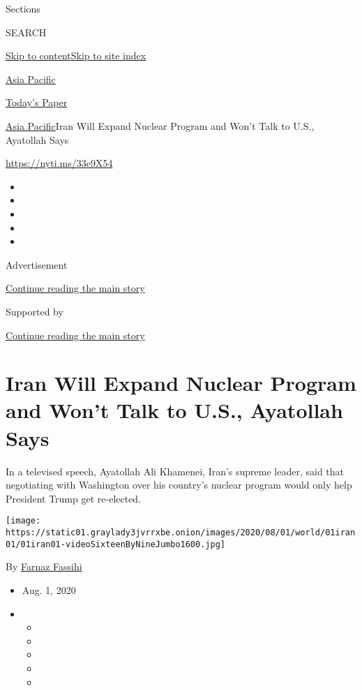 Sections

SEARCH

\protect\hyperlink{site-content}{Skip to
content}\protect\hyperlink{site-index}{Skip to site index}

\href{https://www.nytimes3xbfgragh.onion/section/world/asia}{Asia
Pacific}

\href{https://myaccount.nytimes3xbfgragh.onion/auth/login?response_type=cookie\&client_id=vi}{}

\href{https://www.nytimes3xbfgragh.onion/section/todayspaper}{Today's
Paper}

\href{/section/world/asia}{Asia Pacific}\textbar{}Iran Will Expand
Nuclear Program and Won't Talk to U.S., Ayatollah Says

\url{https://nyti.ms/33e9X54}

\begin{itemize}
\item
\item
\item
\item
\item
\end{itemize}

Advertisement

\protect\hyperlink{after-top}{Continue reading the main story}

Supported by

\protect\hyperlink{after-sponsor}{Continue reading the main story}

\hypertarget{iran-will-expand-nuclear-program-and-wont-talk-to-us-ayatollah-says}{%
\section{Iran Will Expand Nuclear Program and Won't Talk to U.S.,
Ayatollah
Says}\label{iran-will-expand-nuclear-program-and-wont-talk-to-us-ayatollah-says}}

In a televised speech, Ayatollah Ali Khamenei, Iran's supreme leader,
said that negotiating with Washington over his country's nuclear program
would only help President Trump get re-elected.

\texttt{[image: https://static01.graylady3jvrrxbe.onion/images/2020/08/01/world/01iran01/01iran01-videoSixteenByNineJumbo1600.jpg]}

By \href{https://www.nytimes3xbfgragh.onion/by/farnaz-fassihi}{Farnaz
Fassihi}

\begin{itemize}
\item
  Aug. 1, 2020
\item
  \begin{itemize}
  \item
  \item
  \item
  \item
  \item
  \end{itemize}
\end{itemize}

